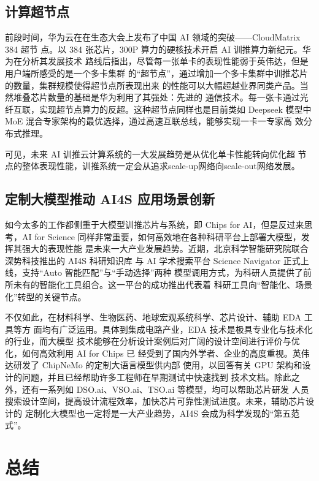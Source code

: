 \documentclass[12pt,a4paper]{article}%
\begin{document}
    \subsection{计算超节点}

    前段时间，华为云在在生态大会上发布了中国 AI 领域的突破——CloudMatrix 384 超节
点。以 384 张芯片，300P 算力的硬核技术开启 AI 训推算力新纪元。华为在分析其发展技术
路线后指出，尽管每一张单卡的表现性能弱于英伟达，但是用户端所感受的是一个多卡集群
的“超节点”，通过增加一个多卡集群中训推芯片的数量，集群规模使得超节点所表现出来
的性能可以大幅超越业界同类产品。当然堆叠芯片数量的基础是华为利用了其强处：先进的
通信技术。每一张卡通过光纤互联，实现超节点算力的反超。这种超节点同样也是目前类如
Deepseek 模型中 MoE 混合专家架构的最优选择，通过高速互联总线，能够实现一卡一专家高
效分布式推理。

可见，未来 AI 训推云计算系统的一大发展趋势是从优化单卡性能转向优化超
节点的整体表现性能，训推系统一定会从追求scale-up网络向scale-out网络发展。



\subsection{定制大模型推动 AI4S 应用场景创新}

如今太多的工作都侧重于大模型训推芯片与系统，即 Chips for AI，但是反过来思考，AI
for Science 同样非常重要，如何高效地在各种科研平台上部署大模型，发挥其强大的表现性能
是未来一大产业发展趋势。近期，北京科学智能研究院联合深势科技推出的 AI4S 科研知识库
与 AI 学术搜索平台 Science Navigator 正式上线，支持“Auto 智能匹配”与“手动选择”两种
模型调用方式，为科研人员提供了前所未有的智能化工具组合。这一平台的成功推出代表着
科研工具向“智能化、场景化”转型的关键节点。

不仅如此，在材料科学、生物医药、地球宏观系统科学、芯片设计、辅助 EDA 工具等方
面均有广泛运用。具体到集成电路产业，EDA 技术是极具专业化与技术化的行业，而大模型
技术能够在分析设计案例后对广阔的设计空间进行评价与优化，如何高效利用 AI for Chips 已
经受到了国内外学者、企业的高度重视。英伟达研发了 ChipNeMo 的定制大语言模型供内部
使用，以回答有关 GPU 架构和设计的问题，并且已经帮助许多工程师在早期测试中快速找到
技术文档。除此之外，还有一系列如 DSO.ai、VSO.ai、TSO.ai 等模型，均可以帮助芯片研发
人员搜索设计空间，提高设计流程效率，加快芯片可靠性测试进度。未来，辅助芯片设计的
定制化大模型也一定将是一大产业趋势，AI4S 会成为科学发现的“第五范式”。
    \section{总结}
\end{document}
